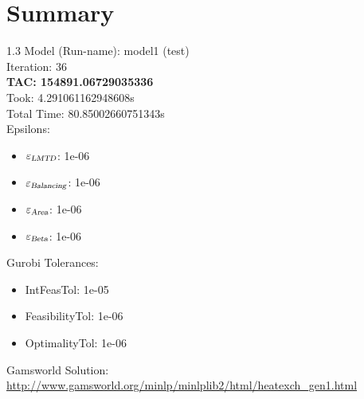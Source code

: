 \documentclass{article}%
\begin{document}
%
\normalsize%
\section{Summary}%
\thispagestyle{plain}%
\begin{spacing}{1.3}%
\Large%
Model (Run-name): model1 (test)\\%
Iteration: 36\\%
\textbf{TAC: 154891.06729035336}\\%
Took: 4.291061162948608s\\%
Total Time: 80.85002660751343s\\%
Epsilons:%
\begin{itemize}%
	\item $\varepsilon_{\textsl{LMTD}}$: 1e-06%
	\item $\varepsilon_{\textsl{Balancing}}$: 1e-06%
	\item $\varepsilon_{\textsl{Area}}$: 1e-06%
	\item $\varepsilon_{\textsl{Beta}}$: 1e-06%
\end{itemize}%
Gurobi Tolerances:%
\begin{itemize}%
	\item IntFeasTol: 1e-05%
	\item FeasibilityTol: 1e-06%
	\item OptimalityTol: 1e-06%
\end{itemize}%
\end{spacing}%
\normalsize%
Gamsworld Solution: \url{http://www.gamsworld.org/minlp/minlplib2/html/heatexch_gen1.html}%
%
\clearpage%
\end{document}
